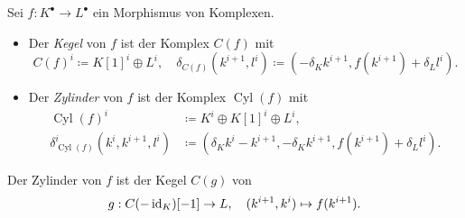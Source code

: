 \documentclass{cheat-sheet}
\newenvironment{centertikzcd}
  {\begin{center}\begin{tikzcd}}
  {\end{tikzcd}\end{center}}
\newcommand{\CCC}[1]{{#1}^{\bullet}} %
\DeclareMathOperator{\Cyl}{Cyl} %
\begin{document}
\begin{defn}
  Sei $f : \CCC{K} \to \CCC{L}$ ein Morphismus von Komplexen.
  \begin{itemize}
    \item Der \emph{Kegel} von $f$ ist der Komplex $C(f)$ mit
    \[
      C(f)^i \coloneqq K[1]^i \oplus L^i, \quad
      \delta_{C(f)}(k^{i+1}, l^i) \coloneqq (- \delta_K k^{i+1}, f(k^{i+1}) + \delta_L l^i).
    \]
    \item Der \emph{Zylinder} von $f$ ist der Komplex $\Cyl(f)$ mit
    \begin{align*}
      \Cyl(f)^i & \coloneqq K^i \oplus K[1]^i \oplus L^i, \\
      \delta_{\Cyl(f)}^i (k^i, k^{i+1}, l^i) & \coloneqq (\delta_K k^i - k^{i+1}, - \delta_K k^{i+1}, f(k^{i+1}) + \delta_L l^i).
    \end{align*}
  \end{itemize}
\end{defn}

\begin{bem}
  Der Zylinder von $f$ ist der Kegel $C(g)$ von
  \[ g : C(-\operatorname{id}_K)[-1] \to L, \quad (k^{i+1}, k^i) \mapsto f(k^{i+1}). \]
\end{bem}

\end{document}
